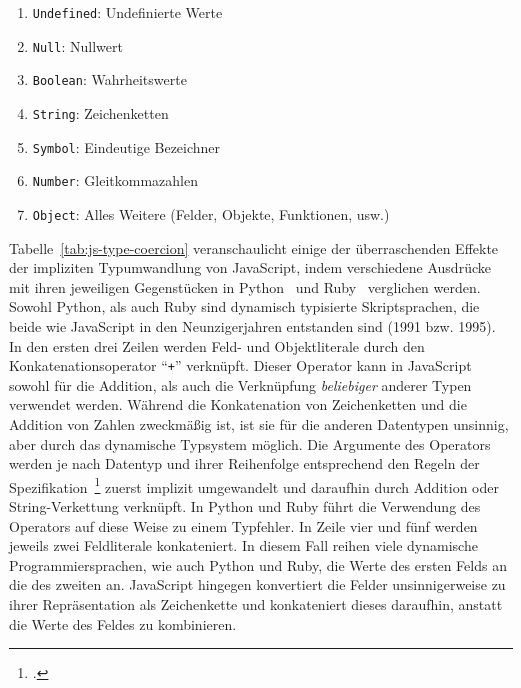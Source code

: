 \begin{enumerate}
  \item \texttt{Undefined}: Undefinierte Werte
  \item \texttt{Null}: Nullwert
  \item \texttt{Boolean}: Wahrheitswerte
  \item \texttt{String}: Zeichenketten
  \item \texttt{Symbol}: Eindeutige Bezeichner
  \item \texttt{Number}: Gleitkommazahlen
  \item \texttt{Object}: Alles Weitere (Felder, Objekte, Funktionen, usw.)
\end{enumerate}

Tabelle~\ref{tab:js-type-coercion} veranschaulicht einige der überraschenden Effekte der impliziten Typumwandlung von JavaScript, indem verschiedene Ausdrücke mit ihren jeweiligen Gegenstücken in Python~\autocite{PYTHON3} und Ruby~\autocite{RUBY} verglichen werden. Sowohl Python, als auch Ruby sind dynamisch typisierte Skriptsprachen, die beide wie JavaScript in den Neunzigerjahren entstanden sind (1991 bzw. 1995).
In den ersten drei Zeilen werden Feld- und Objektliterale durch den Konkatenationsoperator \enquote{\texttt{+}} verknüpft. Dieser Operator kann in JavaScript sowohl für die Addition, als auch die Verknüpfung \emph{beliebiger} anderer Typen verwendet werden. Während die Konkatenation von Zeichenketten und die Addition von Zahlen zweckmäßig ist, ist sie für die anderen Datentypen unsinnig, aber durch das dynamische Typsystem möglich. Die Argumente des Operators werden je nach Datentyp und ihrer Reihenfolge entsprechend den Regeln der Spezifikation~\footcite[Abschn.~12.8.3]{ECMASCRIPT:2019} zuerst implizit umgewandelt und daraufhin durch Addition oder String-Verkettung verknüpft. In Python und Ruby führt die Verwendung des Operators auf diese Weise zu einem Typfehler. In Zeile vier und fünf werden jeweils zwei Feldliterale konkateniert. In diesem Fall reihen viele dynamische Programmiersprachen, wie auch Python und Ruby, die Werte des ersten Felds an die des zweiten an. JavaScript hingegen konvertiert die Felder unsinnigerweise zu ihrer Repräsentation als Zeichenkette und konkateniert dieses daraufhin, anstatt die Werte des Feldes zu kombinieren.

